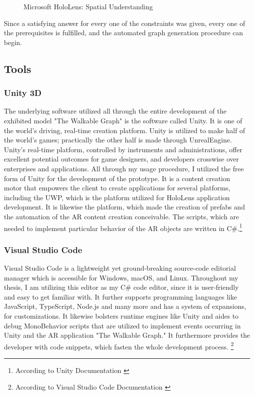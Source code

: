 \documentclass[12pt,a4paper,oneside,american,parskip=half]{article}
\begin{document}
\begin{justify}
\begin{normalsize}
\begin{figure}[h!]
\centering
\caption{Microsoft HoloLens: Spatial Understanding \cite{understanding}}
\end{figure}
\newline
Since a satisfying answer for every one of the constraints was given, every one of the prerequisites is fulfilled, and the automated graph generation procedure can begin.


\subsection{Tools}

\subsubsection{Unity 3D}
The underlying software utilized all through the entire development of the exhibited model "The Walkable Graph" is the software called Unity. It is one of the world's driving, real-time creation platform. Unity is utilized to make half of the world's games; practically the other half is made through UnrealEngine. Unity's real-time platform, controlled by instruments and administrations, offer excellent potential outcomes for game designers, and developers crosswise over enterprises and applications. All through my usage procedure, I utilized the free form of Unity for the development of the prototype.
\newline
It is a content creation motor that empowers the client to create applications for several platforms, including the \ac{UWP}, which is the platform utilized for HoloLens application development. It is likewise the platform, which made the creation of prefabs and the automation of the AR content creation conceivable. The scripts, which are needed to implement particular behavior of the AR objects are written in C\#.\footnote{According to Unity Documentation \cite{unity2}}

\subsubsection{Visual Studio Code}
Visual Studio Code is a lightweight yet ground-breaking source-code editorial manager which is accessible for Windows, macOS, and Linux. Throughout my thesis, I am utilizing this editor as my C\# code editor, since it is user-friendly and easy to get familiar with. 
It further supports programming languages like JavaScript, TypeScript, Node.js and many more and has a system of expansions, for customizations.
\newline
It likewise bolsters runtime engines like Unity and aides to debug MonoBehavior scripts that are utilized to implement events occurring in Unity and the AR application "The Walkable Graph." It furthermore provides the developer with code snippets, which fasten the whole development process. \footnote{According to Visual Studio Code Documentation \cite{vscode}} 


\end{normalsize}
\end{justify}
\end{document}
